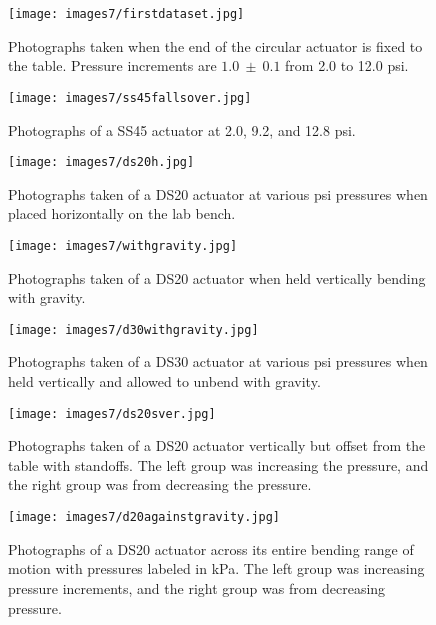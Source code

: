 \begin{figure}[!ht]
    \centering
     \texttt{[image: images7/firstdataset.jpg]}
    \caption{Photographs taken when the end of the circular actuator is fixed to the table. Pressure increments are $1.0~\pm~0.1$ from 2.0 to 12.0 psi.}
    \label{fig:firstdataset}
\end{figure}

\begin{figure}[!ht]
    \centering
     \texttt{[image: images7/ss45fallsover.jpg]}
    \caption{Photographs of a SS45 actuator at 2.0, 9.2, and 12.8 psi.}
    \label{fig:ss45fallsover}
\end{figure}

\clearpage

\begin{figure}[!ht]
    \centering
     \texttt{[image: images7/ds20h.jpg]}
    \caption{Photographs taken of a DS20 actuator at various psi pressures when placed horizontally on the lab bench.}
    \label{fig:ds20h}
\end{figure}

\clearpage
\begin{figure}[!ht]
    \centering
     \texttt{[image: images7/withgravity.jpg]}
    \caption{Photographs taken of a DS20 actuator when held vertically bending with gravity.}
    \label{fig:withgravity}
\end{figure}

\begin{figure}[!ht]
    \centering
     \texttt{[image: images7/d30withgravity.jpg]}
    \caption{Photographs taken of a DS30 actuator at various psi pressures when held vertically and allowed to unbend with gravity.}
    \label{fig:d30withgravity}
\end{figure}

\clearpage

\begin{figure}[!ht]
    \centering
     \texttt{[image: images7/ds20sver.jpg]}
    \caption{Photographs taken of a DS20 actuator vertically but offset from the table with standoffs. The left group was increasing the pressure, and the right group was from decreasing the pressure.}
    \label{fig:ds20sver}
\end{figure}

\clearpage

\begin{figure}[!ht]
    \centering
     \texttt{[image: images7/d20againstgravity.jpg]}
    \caption{Photographs of a DS20 actuator across its entire bending range of motion with pressures labeled in kPa. The left group was increasing pressure increments, and the right group was from decreasing pressure.}
    \label{fig:d20againstgravity}
\end{figure}

